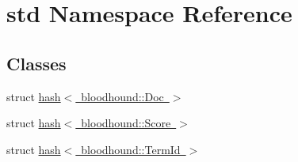 \hypertarget{namespacestd}{}\section{std Namespace Reference}
\label{namespacestd}
\subsection*{Classes}
\begin{DoxyCompactItemize}
\item 
struct \mbox{\hyperlink{structstd_1_1hash_3_01bloodhound_1_1Doc_01_4}{hash$<$ bloodhound\+::\+Doc $>$}}
\item 
struct \mbox{\hyperlink{structstd_1_1hash_3_01bloodhound_1_1Score_01_4}{hash$<$ bloodhound\+::\+Score $>$}}
\item 
struct \mbox{\hyperlink{structstd_1_1hash_3_01bloodhound_1_1TermId_01_4}{hash$<$ bloodhound\+::\+Term\+Id $>$}}
\end{DoxyCompactItemize}
